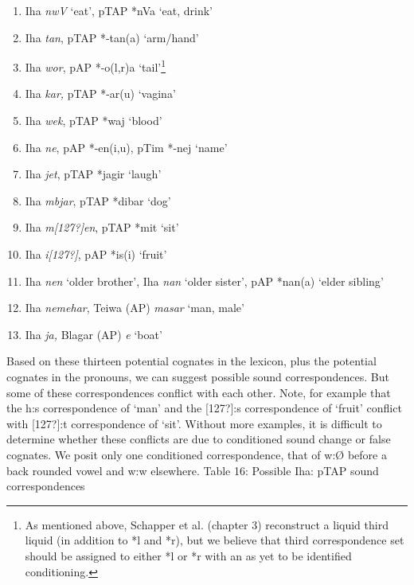 \begin{enumerate}
\item Iha \textit{nwV} {\textquoteleft}eat{\textquoteright}, pTAP *nVa {\textquoteleft}eat, drink{\textquoteright}
\item Iha \textit{tan}, pTAP *-tan(a) {\textquoteleft}arm/hand{\textquoteright}
\item Iha \textit{wor}, pAP *-o(l,r)a {\textquoteleft}tail{\textquoteright}\footnote{ As mentioned above,  Schapper et al. (chapter 3) reconstruct a liquid third liquid (in addition to *l and *r), but we believe that third correspondence set should be assigned to either *l or *r with an as yet to be identified conditioning. }
\item Iha \textit{kar, }pTAP *-ar(u) {\textquoteleft}vagina{\textquoteright}
\item Iha \textit{wek}, pTAP *waj {\textquoteleft}blood{\textquoteright}
\item Iha \textit{ne}, pAP *-en(i,u), pTim *-nej {\textquoteleft}name{\textquoteright}
\item Iha \textit{jet}, pTAP *jagir {\textquoteleft}laugh{\textquoteright}
\item Iha \textit{mbjar}, pTAP *dibar {\textquoteleft}dog{\textquoteright} 
\item Iha \textit{m[127?]en}, pTAP *mit {\textquoteleft}sit{\textquoteright}
\item Iha \textit{i[127?]}, pAP *is(i) {\textquoteleft}fruit{\textquoteright}
\item Iha \textit{nen }{\textquoteleft}older brother{\textquoteright}, Iha \textit{nan} {\textquoteleft}older sister{\textquoteright}, pAP *nan(a) {\textquoteleft}elder sibling{\textquoteright}
\item Iha \textit{nemehar}, Teiwa (AP) \textit{masar }{\textquoteleft}man, male{\textquoteright}
\item Iha \textit{ja, }Blagar (AP) \textit{{\textdyoghlig}}\textit{e} {\textquoteleft}boat{\textquoteright} 
\end{enumerate}
{\centering
Based on these thirteen potential cognates in the lexicon, plus the potential cognates in the pronouns, we can suggest possible sound correspondences. But some of these correspondences conflict with each other. Note, for example that the h:s correspondence of {\textquoteleft}man{\textquoteright} and the [127?]:s correspondence of {\textquoteleft}fruit{\textquoteright} conflict with [127?]:t correspondence of {\textquoteleft}sit{\textquoteright}. Without more examples, it is difficult to determine whether these conflicts are due to conditioned sound change or false cognates. We posit only one conditioned correspondence, that of w:{\O} before a back rounded vowel and w:w elsewhere. Table 16: Possible Iha: pTAP sound correspondences
\par}

